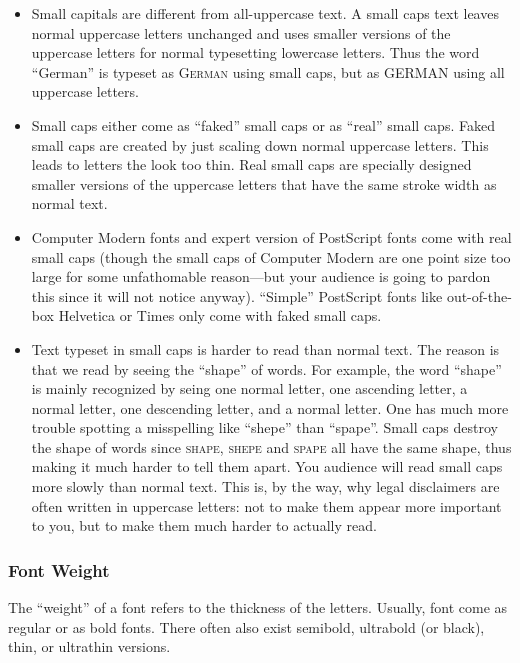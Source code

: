 \begin{itemize}
\item
  Small capitals are different from all-uppercase text. A small caps
  text leaves normal uppercase letters unchanged and uses smaller
  versions of the uppercase letters for normal typesetting lowercase
  letters. Thus the word ``German'' is typeset as \textsc{German}
  using small caps, but as \uppercase{German} using all uppercase
  letters.
\item
  Small caps either come as ``faked'' small caps or as ``real''
  small caps. Faked small caps are created by just scaling down
  normal uppercase letters. This leads to letters the look too
  thin. Real small caps are specially designed smaller versions of
  the uppercase letters that have the same stroke width as normal
  text.
\item
  Computer Modern fonts and expert version of PostScript fonts come
  with real small caps (though the small caps of Computer Modern are
  one point size too large for some unfathomable reason---but your
  audience is going to pardon this since it will not notice
  anyway). ``Simple'' PostScript fonts like out-of-the-box Helvetica
  or Times only come with faked small caps.
\item
  Text typeset in small caps is harder to read than normal text. The
  reason is that we read by seeing the ``shape'' of words. For
  example, the word ``shape'' is mainly recognized by seing one
  normal letter, one ascending letter, a normal letter, one
  descending letter, and a normal letter. One has much more trouble
  spotting a misspelling like ``shepe''  than ``spape''. Small caps
  destroy the shape of words since \textsc{shape}, \textsc{shepe}
  and \textsc{spape} all have the same shape, thus making it much
  harder to tell them apart. You audience will read small caps more
  slowly than normal text. This is, by the way, why legal
  disclaimers are often written in uppercase letters: not to make
  them appear more important to you, but to make them much harder to
  actually read.
\end{itemize}



\subsubsection{Font Weight}

The ``weight'' of a font refers to the thickness of the
letters. Usually, font come as regular or as bold fonts. There often
also exist semibold, ultrabold (or black), thin, or ultrathin
versions.

